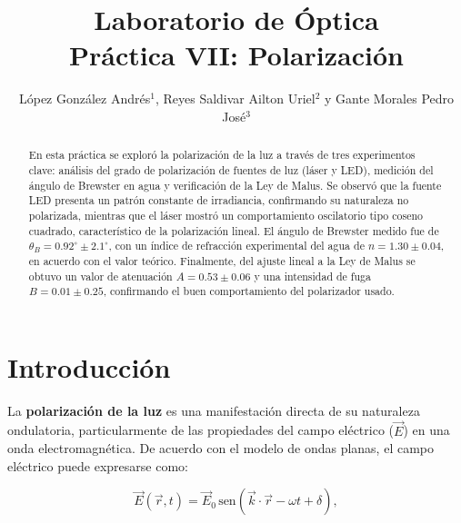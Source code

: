 \documentclass[article,12pt]{elsarticle}
\begin{document}

\begin{frontmatter}
    \title{Laboratorio de Óptica \\ Práctica VII: Polarización}
    \author{López González Andrés$^1$, Reyes Saldivar Ailton Uriel$^2$ y Gante Morales Pedro José$^3$}
    \address{$^1$ Facultad de Ciencias, Universidad Nacional Autónoma de México, México CDMX.}

\begin{abstract}

En esta práctica se exploró la polarización de la luz a través de tres experimentos clave: análisis del grado de polarización de fuentes de luz (láser y LED), medición del ángulo de Brewster en agua y verificación de la Ley de Malus. Se observó que la fuente LED presenta un patrón constante de irradiancia, confirmando su naturaleza no polarizada, mientras que el láser mostró un comportamiento oscilatorio tipo coseno cuadrado, característico de la polarización lineal. El ángulo de Brewster medido fue de \( \theta_B = 0.92^\circ \pm 2.1^\circ \), con un índice de refracción experimental del agua de \( n = 1.30 \pm 0.04 \), en acuerdo con el valor teórico. Finalmente, del ajuste lineal a la Ley de Malus se obtuvo un valor de
 atenuación \( A = 0.53\pm 0.06 \) y una intensidad de fuga \( B = 0.01\pm 0.25 \), confirmando el buen comportamiento del polarizador usado.


\end{abstract}
    
\end{frontmatter}

\section{Introducción}

La \textbf{polarización de la luz} es una manifestación directa de su naturaleza ondulatoria, particularmente de las propiedades del campo eléctrico (\(\vec{E}\)) en una onda electromagnética. De acuerdo con el modelo de ondas planas, el campo eléctrico puede expresarse como:

\begin{mdframed}
\begin{equation}
    \vec{E}(\vec{r}, t) = \vec{E}_0 \, \text{sen}(\vec{k} \cdot \vec{r} - \omega t + \delta),
\end{equation}
\end{mdframed}
\end{document}
